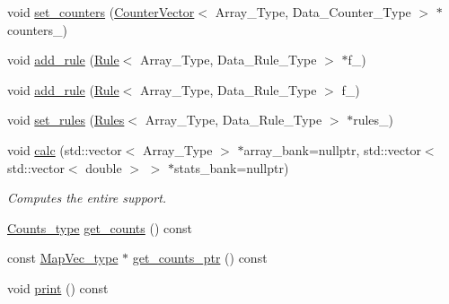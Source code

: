 \begin{DoxyCompactItemize}
\item 
void \hyperlink{class_support_aa6070db8aa83e220b8c9a1d80dfb57c0}{set\+\_\+counters} (\hyperlink{class_counter_vector}{Counter\+Vector}$<$ Array\+\_\+\+Type, Data\+\_\+\+Counter\+\_\+\+Type $>$ $\ast$counters\+\_\+)
\item 
void \hyperlink{class_support_a3113a4586c541aa25db7b4a864b748a2}{add\+\_\+rule} (\hyperlink{class_rule}{Rule}$<$ Array\+\_\+\+Type, Data\+\_\+\+Rule\+\_\+\+Type $>$ $\ast$f\+\_\+)
\item 
void \hyperlink{class_support_aa817cb5d6c48dda3ecfeef2c5897b537}{add\+\_\+rule} (\hyperlink{class_rule}{Rule}$<$ Array\+\_\+\+Type, Data\+\_\+\+Rule\+\_\+\+Type $>$ f\+\_\+)
\item 
void \hyperlink{class_support_a66dc1a0e7097d547ea9c84df777ad477}{set\+\_\+rules} (\hyperlink{class_rules}{Rules}$<$ Array\+\_\+\+Type, Data\+\_\+\+Rule\+\_\+\+Type $>$ $\ast$rules\+\_\+)
\item 
void \hyperlink{class_support_afa36b8c1348e28c51296379157f58081}{calc} (std\+::vector$<$ Array\+\_\+\+Type $>$ $\ast$array\+\_\+bank=nullptr, std\+::vector$<$ std\+::vector$<$ double $>$ $>$ $\ast$stats\+\_\+bank=nullptr)
\begin{DoxyCompactList}\small\item\em Computes the entire support. \end{DoxyCompactList}\item 
\hyperlink{typedefs_8hpp_aee40fa17c1fddb63dd1f2b1470ade95b}{Counts\+\_\+type} \hyperlink{class_support_a5d93a94eaed9b1157fb934284883fd47}{get\+\_\+counts} () const
\item 
const \hyperlink{typedefs_8hpp_a02ed8dec96bc528c8bc3d8cb3c4674a5}{Map\+Vec\+\_\+type} $\ast$ \hyperlink{class_support_abcb4dea3c5a1b140990821900432f90e}{get\+\_\+counts\+\_\+ptr} () const
\item 
void \hyperlink{class_support_af87b2e85ec72e394387946023508e7fd}{print} () const
\end{DoxyCompactItemize}
